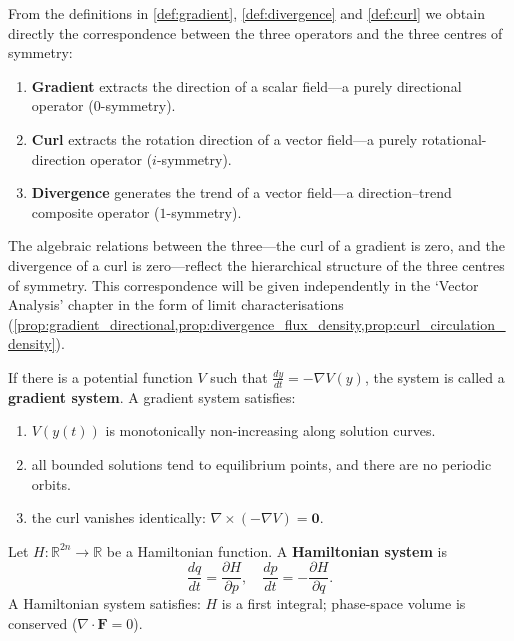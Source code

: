 \begin{remark}\label{rem:three_operators_direction_trend}
From the definitions in \cref{def:gradient}, \cref{def:divergence} and \cref{def:curl} we obtain directly the correspondence between the three operators and the three centres of symmetry:
\begin{enumerate}[label=(\roman*)]
    \item \textbf{Gradient} extracts the direction of a scalar field---a purely directional operator ($0$-symmetry).
    \item \textbf{Curl} extracts the rotation direction of a vector field---a purely rotational-direction operator ($i$-symmetry).
    \item \textbf{Divergence} generates the trend of a vector field---a direction--trend composite operator ($1$-symmetry).
\end{enumerate}
The algebraic relations between the three---the curl of a gradient is zero, and the divergence of a curl is zero---reflect the hierarchical structure of the three centres of symmetry. This correspondence will be given independently in the `Vector Analysis' chapter in the form of limit characterisations (\cref{prop:gradient_directional,prop:divergence_flux_density,prop:curl_circulation_density}).
\end{remark}

\begin{definition}\label{def:gradient_system}
If there is a potential function $V$ such that $\frac{dy}{dt} = -\nabla V(y)$, the system is called a \textbf{gradient system}. A gradient system satisfies:
\begin{enumerate}[label=(\roman*)]
    \item $V(y(t))$ is monotonically non-increasing along solution curves.
    \item all bounded solutions tend to equilibrium points, and there are no periodic orbits.
    \item the curl vanishes identically: $\nabla \times (-\nabla V) = \mathbf{0}$.
\end{enumerate}
\end{definition}

\begin{definition}\label{def:hamiltonian_system}
Let $H: \mathbb{R}^{2n} \to \mathbb{R}$ be a Hamiltonian function. A \textbf{Hamiltonian system} is
\[
\frac{dq}{dt} = \frac{\partial H}{\partial p}, \quad \frac{dp}{dt} = -\frac{\partial H}{\partial q}.
\]
A Hamiltonian system satisfies: $H$ is a first integral; phase-space volume is conserved ($\nabla \cdot \mathbf{F} = 0$).
\end{definition}


